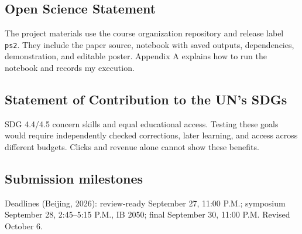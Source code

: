 \subsection*{Open Science Statement}
The project materials use the course organization repository and release label \texttt{ps2}. They include the paper source, notebook with saved outputs, dependencies, demonstration, and editable poster. Appendix A explains how to run the notebook and records my execution.

\subsection*{Statement of Contribution to the UN's SDGs}
SDG 4.4/4.5 \cite{un2026} concern skills and equal educational access. Testing these goals would require independently checked corrections, later learning, and access across different budgets. Clicks and revenue alone cannot show these benefits.

\subsection*{Submission milestones}
Deadlines (Beijing, 2026): review-ready September 27, 11:00 P.M.; symposium September 28, 2:45--5:15 P.M., IB 2050; final September 30, 11:00 P.M. Revised October 6.
